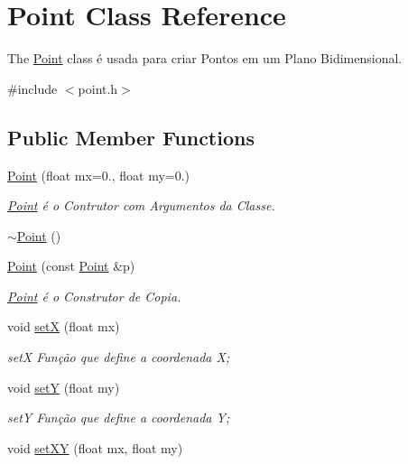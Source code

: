 \hypertarget{class_point}{}\section{Point Class Reference}
\label{class_point}


The \mbox{\hyperlink{class_point}{Point}} class é usada para criar Pontos em um Plano Bidimensional.  




{\ttfamily \#include $<$point.\+h$>$}

\subsection*{Public Member Functions}
\begin{DoxyCompactItemize}
\item 
\mbox{\hyperlink{class_point_a2e9cc55fe05ce04457997f4f19aaa28d}{Point}} (float mx=0., float my=0.)
\begin{DoxyCompactList}\small\item\em \mbox{\hyperlink{class_point}{Point}} é o Contrutor com Argumentos da Classe. \end{DoxyCompactList}\item 
\mbox{\hyperlink{class_point_a395fa04b4ec126b66fc053f829a30cc1}{$\sim$\+Point}} ()
\item 
\mbox{\hyperlink{class_point_af0c0f20db1616447bc78184ed537ef6e}{Point}} (const \mbox{\hyperlink{class_point}{Point}} \&p)
\begin{DoxyCompactList}\small\item\em \mbox{\hyperlink{class_point}{Point}} é o Construtor de Copia. \end{DoxyCompactList}\item 
void \mbox{\hyperlink{class_point_acee4acaa1d515e9973145f977e500fe6}{setX}} (float mx)
\begin{DoxyCompactList}\small\item\em setX Função que define a coordenada X; \end{DoxyCompactList}\item 
void \mbox{\hyperlink{class_point_a756b3f64d961a5059302f42e1fcf2332}{setY}} (float my)
\begin{DoxyCompactList}\small\item\em setY Função que define a coordenada Y; \end{DoxyCompactList}\item 
void \mbox{\hyperlink{class_point_afe2b937778d9fe5c135ab61de91271e9}{set\+XY}} (float mx, float my)

\end{DoxyCompactItemize}
